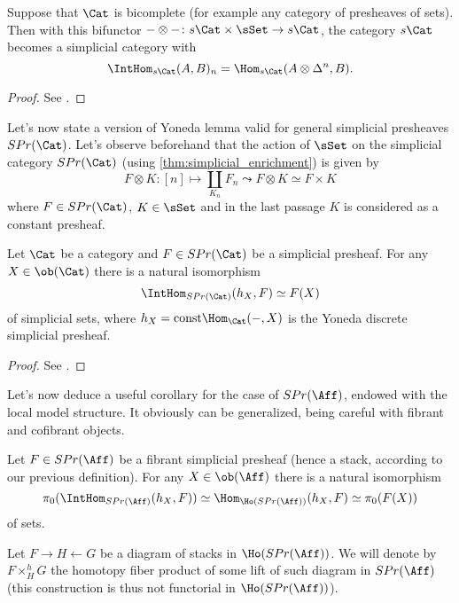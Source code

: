            \begin{thm}
                \label{thm:simplicial_enrichment}
                Suppose that $\Cat$ is bicomplete (for example any category of presheaves of sets). Then with this bifunctor $- \otimes -\colon s\Cat \times \sSet \to s\Cat$, the category $s\Cat$ becomes a simplicial category with \[\IntHom_{s\Cat}(A, B)_n = \Hom_{s\Cat}(A \otimes \Delta^n, B). \]
            \end{thm}
            \begin{proof}
                See \cite[Chapter~II, Theorem~2.5]{GoeJar:simpl_hom}.
            \end{proof}
            Let's now state a version of Yoneda lemma valid for general simplicial presheaves $SPr(\Cat)$. Let's observe beforehand that the action of $\sSet$ on the simplicial category $SPr(\Cat)$ (using \cref{thm:simplicial_enrichment}) is given by \[F \otimes K\colon [n] \mapsto \coprod_{K_n} F_n \leadsto F \otimes K \simeq F \times K \] where $F \in SPr(\Cat)$, $K \in \sSet$ and in the last passage $K$ is considered as a constant presheaf. 
            \begin{lemma}
                \label{lemma:simplicial_yoneda_lemma}
                Let $\Cat$ be a category and $F \in SPr(\Cat)$ be a simplicial presheaf. For any $X \in \ob(\Cat)$ there is a natural isomorphism \[\IntHom_{SPr(\Cat)}(h_X, F) \simeq F(X) \] of simplicial sets, where $h_X = \mathrm{const} \Hom_{\Cat}(-, X)$ is the Yoneda discrete simplicial presheaf. 
            \end{lemma}
            \begin{proof}
                See \cite[Theorem~5.3.6]{Vez:seminar}.
            \end{proof}
            Let's now deduce a useful corollary for the case of $SPr(\Aff)$, endowed with the local model structure. It obviously can be generalized, being careful with fibrant and cofibrant objects.
            \begin{corollary}
                \label{corollary:simplicial_yoneda_lemma_pi0}
                Let $F \in SPr(\Aff)$ be a fibrant simplicial presheaf (hence a stack, according to our previous definition). For any $X \in \ob(\Aff)$ there is a natural isomorphism 
                \[\pi_0(\IntHom_{SPr(\Aff)}(h_X, F) ) \simeq \Hom_{\Ho(SPr(\Aff))}(h_X, F) \simeq \pi_0(F(X))  \] of sets.
            \end{corollary}
            \begin{defn}
                \label{defn:homotopy_pullback_classic}
                Let $F \longrightarrow H \longleftarrow G$ be a diagram of stacks in $\Ho(SPr(\Aff))$. We will denote by $F \times^h_H G$ the homotopy fiber product of some lift of such diagram in $SPr(\Aff)$ (this construction is thus not functorial in $\Ho(SPr(\Aff))$).
            \end{defn}

